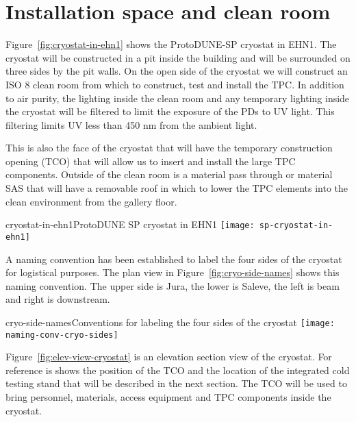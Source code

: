 
\section{Installation space and clean room}

Figure~\ref{fig:cryostat-in-ehn1} shows the ProtoDUNE-SP cryostat in EHN1.  The cryostat will be constructed in a pit inside the building and will be surrounded on three sides by the pit walls.  On the open side of the cryostat we will construct an ISO 8 clean room from which to construct, test and install the TPC.  In addition to air purity, the lighting inside the clean room and any temporary lighting inside the cryostat will be filtered to limit the exposure of the PDs to UV light.  This filtering limits UV less than 450 nm from the ambient light.  

This is also the face of the cryostat that will have the temporary construction opening (TCO) that will allow us to insert and install the large TPC components.  Outside of the clean room is a material pass through or material SAS that will have a removable roof in which to lower the TPC elements into the clean environment from the gallery floor.

\begin{cdrfigure}{cryostat-in-ehn1}{ProtoDUNE SP cryostat in EHN1}
\texttt{[image: sp-cryostat-in-ehn1]}
\end{cdrfigure}

A naming convention has been established to label the four sides of the cryostat for logistical purposes.  The plan view in Figure~\ref{fig:cryo-side-names} shows this naming convention.  The upper side is Jura, the lower is Saleve, the left is beam and right is downstream.

\begin{cdrfigure}{cryo-side-names}{Conventions for labeling the four sides of the cryostat}
\texttt{[image: naming-conv-cryo-sides]}
\end{cdrfigure}

Figure~\ref{fig:elev-view-cryostat} is an elevation section view of the cryostat.  For reference is shows the position of the TCO and the location of the integrated cold testing stand that will be described in the next section.  The TCO will be used to bring personnel, materials, access equipment and TPC components inside the cryostat. 

